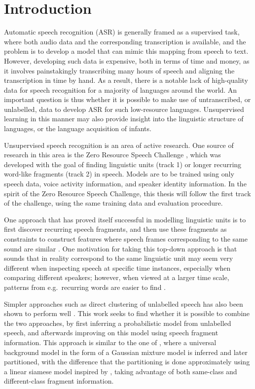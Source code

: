 \section{Introduction}
\label{sec:introduction}
Automatic speech recognition (ASR) is generally framed as a supervised task, where both audio data and the corresponding transcription is available, and the problem is to develop a model that can mimic this mapping from speech to text.
However, developing such data is expensive, both in terms of time and money, as it involves painstakingly transcribing many hours of speech and aligning the transcription in time by hand.
As a result, there is a notable lack of high-quality data for speech recognition for a majority of languages around the world.
An important question is thus whether it is possible to make use of untranscribed, or unlabelled, data to develop ASR for such low-resource languages.
Unsupervised learning in this manner may also provide insight into the linguistic structure of languages, or the language acquisition of infants.

Unsupervised speech recognition is an area of active research.
One source of research in this area is the Zero Resource Speech Challenge \parencite{versteegh2015zero}, which was developed with the goal of finding linguistic units (track 1) or longer recurring word-like fragments (track 2) in speech.
Models are to be trained using only speech data, voice activity information, and speaker identity information.
In the spirit of the Zero Resource Speech Challenge, this thesis will follow the first track of the challenge, using the same training data and evaluation procedure.

One approach that has proved itself successful in modelling linguistic units is to first discover recurring speech fragments, and then use these fragments as constraints to construct features where speech frames corresponding to the same sound are similar \parencite{synnaeve2014phonetics,thiolliere2015hybrid}.
One motivation for taking this top-down approach is that sounds that in reality correspond to the same linguistic unit may seem very different when inspecting speech at specific time instances, especially when comparing different speakers; however, when viewed at a larger time scale, patterns from e.g.\ recurring words are easier to find \parencite{jansen2013weak}.

Simpler approaches such as direct clustering of unlabelled speech has also been shown to perform well \parencite{chen2015parallel}.
This work seeks to find whether it is possible to combine the two approaches, by first inferring a probabilistic model from unlabelled speech, and afterwards improving on this model using speech fragment information.
This approach is similar to the one of \textcite{jansen2013weak}, where a universal background model in the form of a Gaussian mixture model is inferred and later partitioned, with the difference that the partitioning is done approximately using a linear siamese model inspired by \textcite{synnaeve2014phonetics}, taking advantage of both same-class and different-class fragment information.

